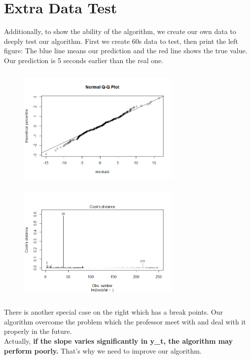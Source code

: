 \documentclass{article}
\begin{document}
\section{Extra Data Test}
Additionally, to show the ability of the algorithm, we create our own data to deeply test our algorithm.
First we create 60s data to test, then print the left figure: The blue line means our prediction and the red line shows the true value. Our prediction is 5 seconds earlier than the real one.\\
\begin{figure}[ht]
	\centering
	\includegraphics[width=8cm,height=6cm]{2.png}
	\includegraphics[width=8cm,height=6cm]{3.png}  
\end{figure}
\newline
There is another special case on the right which has a break points. Our algorithm overcome the problem which the professor meet with and deal with it properly in the future.\\
\newline
Actually, \textbf{if the slope varies significantly in y\_t, the algorithm may perform poorly.} That's why we need to improve our algorithm.
\end{document}
